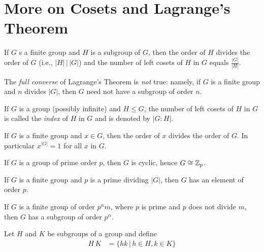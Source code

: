 \documentclass[10pt,a4paper]{report}
\begin{document}
\section{More on Cosets and Lagrange's Theorem}

\begin{theorem}
If $G$ s a finite group and $H$ is a subgroup of $G$, then the order of $H$ divides the order of $G$ (i.e., $|H|\,\left.\right|\,|G|$) and the number of left cosets of $H$ in $G$ equals $\frac{|G|}{|H|}$.

\begin{remark}The \textit{full converse} of Lagrange's Theorem is \textit{not} true:  namely, if $G$ is a finite group and $n$ divides $|G|$, then $G$ need not have a subgroup of order $n$.
\end{remark}
\end{theorem}

\begin{definition} If $G$ is a group (possibly infinite) and $H \le G$, the number of left cosets of $H$ in $G$ is called the \textit{index} of $H$ in $G$ and is denoted by $|G:H|$.
\end{definition}

\begin{corollary}  If $G$ is a finite group and $x \in G$, then the order of $x$ divides the order of $G$.  In particular $x^{|G|}=1$ for all $x$ in $G$.
\end{corollary}

\begin{corollary}  If $G$ is a group of prime order $p$, then $G$ is cyclic, hence $G \cong \mathbb{Z}_p$.
\end{corollary}

\begin{theorem}  If $G$ is a finite group and $p$ is a prime dividing $|G|$, then $G$ has an element of order $p$.

\end{theorem}

\begin{theorem}[Sylow] If $G$ is a finite group of order $p^\alpha m$, where $p$ is prime and $p$ does not divide $m$, then $G$ has a subgroup of order $p^\alpha$.
\end{theorem}

\begin{definition}Let $H$ and $K$ be subgroups of a group and define 
\begin{align*}
	H\, K &= \{hk\,|\,h \in H, k\in K\}
\end{align*}
\end{definition}
\end{document}
